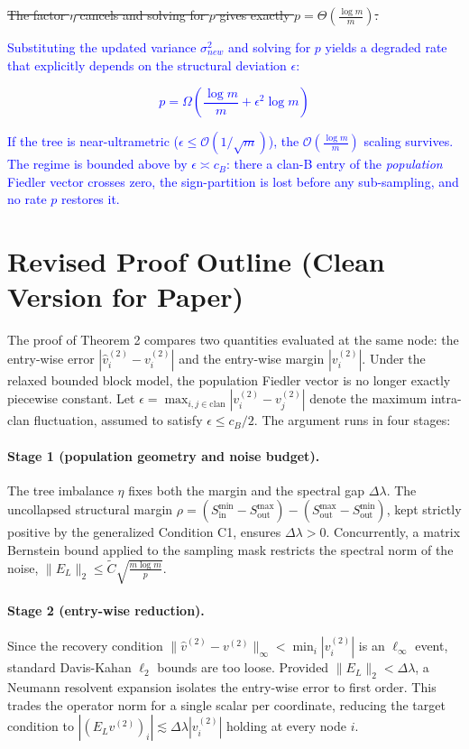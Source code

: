\documentclass{article}
\begin{document}
\sout{The factor $\eta$ cancels and solving for $p$ gives exactly $p = \Theta\left(\frac{\log m}{m}\right)$.}

\textcolor{blue}{Substituting the updated variance $\sigma_{new}^2$ and solving for $p$ yields a degraded rate that explicitly depends on the structural deviation $\epsilon$:}

\textcolor{blue}{$$ p = \Omega\left(\frac{\log m}{m} + \epsilon^2 \log m\right) $$}

\textcolor{blue}{If the tree is near-ultrametric ($\epsilon \le \mathcal{O}(1/\sqrt{m})$), the $\mathcal{O}(\frac{\log m}{m})$ scaling survives. The regime is bounded above by $\epsilon \asymp c_B$: there a clan-B entry of the \emph{population} Fiedler vector crosses zero, the sign-partition is lost before any sub-sampling, and no rate $p$ restores it.}

\newpage
\appendix
\section{Revised Proof Outline (Clean Version for Paper)}

The proof of Theorem 2 compares two quantities evaluated at the same node: the entry-wise error $|\hat{v}_i^{(2)} - v_i^{(2)}|$ and the entry-wise margin $|v_i^{(2)}|$. Under the relaxed bounded block model, the population Fiedler vector is no longer exactly piecewise constant. Let $\epsilon = \max_{i,j \in \text{clan}} |v_i^{(2)} - v_j^{(2)}|$ denote the maximum intra-clan fluctuation, assumed to satisfy $\epsilon \le c_B/2$. The argument runs in four stages:

\paragraph{Stage 1 (population geometry and noise budget).} 
The tree imbalance $\eta$ fixes both the margin and the spectral gap $\Delta\lambda$. The uncollapsed structural margin $\rho = (S_{\text{in}}^{\min} - S_{\text{out}}^{\max}) - (S_{\text{out}}^{\max} - S_{\text{out}}^{\min})$, kept strictly positive by the generalized Condition C1, ensures $\Delta\lambda > 0$. Concurrently, a matrix Bernstein bound applied to the sampling mask restricts the spectral norm of the noise, $\|E_L\|_2 \le \tilde{C} \sqrt{\frac{m \log m}{p}}$.

\paragraph{Stage 2 (entry-wise reduction).} 
Since the recovery condition $\|\hat{v}^{(2)} - v^{(2)}\|_\infty < \min_i |v_i^{(2)}|$ is an $\ell_\infty$ event, standard Davis-Kahan $\ell_2$ bounds are too loose. Provided $\|E_L\|_2 < \Delta\lambda$, a Neumann resolvent expansion isolates the entry-wise error to first order. This trades the operator norm for a single scalar per coordinate, reducing the target condition to $|(E_L v^{(2)})_i| \lesssim \Delta\lambda |v_i^{(2)}|$ holding at every node $i$.
\end{document}
